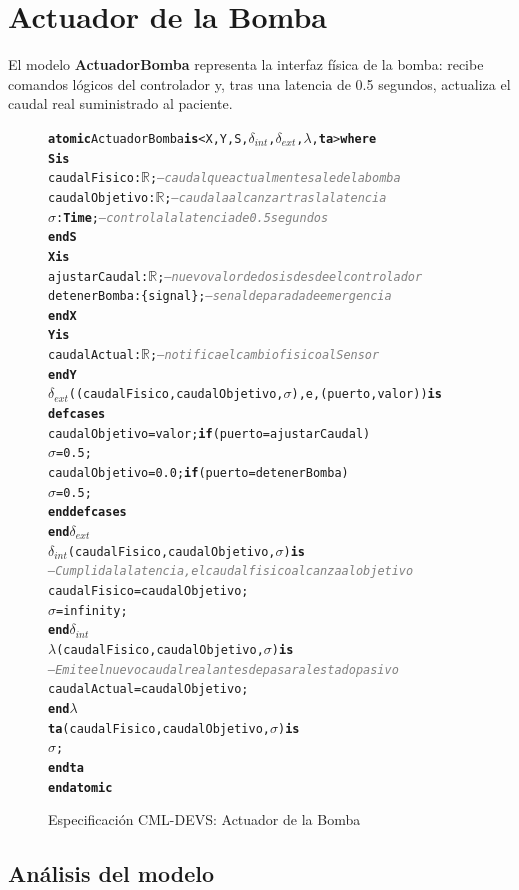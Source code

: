 \documentclass[12pt, a4paper]{article}
\newcommand{\kw}[1]{\textbf{#1}}          %
\newcommand{\cmlR}{$\mathbb{R}$}
\newcommand{\cmlTime}{\textbf{Time}}
\newcommand{\cmlsigma}{$\sigma$}
\newcommand{\dint}{$\delta_{\mathit{int}}$}
\newcommand{\dext}{$\delta_{\mathit{ext}}$}
\newcommand{\clambda}{$\lambda$}
\newcommand{\cmlta}{\textbf{ta}}
\newcommand{\cmlcomment}[1]{\textit{\textcolor{gray}{#1}}}
\newenvironment{cmldevs}{%
  \begin{alltt}\small%
}{%
  \end{alltt}%
}
\begin{document}
\section{Actuador de la Bomba}

El modelo \textbf{ActuadorBomba} representa la interfaz física de la bomba: recibe
comandos lógicos del controlador y, tras una latencia de 0.5 segundos, actualiza
el caudal real suministrado al paciente.

\begin{figure}[H]
\begin{cmldevs}
\kw{atomic} ActuadorBomba \kw{is} <X, Y, S, \dint{}, \dext{}, \clambda{}, \cmlta{}> \kw{where}
\kw{S is}
    caudalFisico   : \cmlR{};       \cmlcomment{-- caudal que actualmente sale de la bomba}
    caudalObjetivo : \cmlR{};       \cmlcomment{-- caudal a alcanzar tras la latencia}
    \cmlsigma{}            : \cmlTime{};    \cmlcomment{-- controla la latencia de 0.5 segundos}
\kw{end S}
\kw{X is}
    ajustarCaudal : \cmlR{};        \cmlcomment{-- nuevo valor de dosis desde el controlador}
    detenerBomba  : \{signal\};     \cmlcomment{-- senal de parada de emergencia}
\kw{end X}
\kw{Y is}
    caudalActual : \cmlR{};         \cmlcomment{-- notifica el cambio fisico al Sensor}
\kw{end Y}
\dext{}((caudalFisico, caudalObjetivo, \cmlsigma{}), e, (puerto, valor)) \kw{is}
    \kw{defcases}
        caudalObjetivo = valor;   \kw{if} (puerto = ajustarCaudal)
        \cmlsigma{} = 0.5;
        caudalObjetivo = 0.0;     \kw{if} (puerto = detenerBomba)
        \cmlsigma{} = 0.5;
    \kw{end defcases}
\kw{end} \dext{}
\dint{}(caudalFisico, caudalObjetivo, \cmlsigma{}) \kw{is}
    \cmlcomment{-- Cumplida la latencia, el caudal fisico alcanza al objetivo}
    caudalFisico = caudalObjetivo;
    \cmlsigma{}          = infinity;
\kw{end} \dint{}
\clambda{}(caudalFisico, caudalObjetivo, \cmlsigma{}) \kw{is}
    \cmlcomment{-- Emite el nuevo caudal real antes de pasar al estado pasivo}
    caudalActual = caudalObjetivo;
\kw{end} \clambda{}
\cmlta{}(caudalFisico, caudalObjetivo, \cmlsigma{}) \kw{is}
    \cmlsigma{};
\kw{end} \cmlta{}
\kw{end atomic}
\end{cmldevs}
\caption{Especificación CML-DEVS: Actuador de la Bomba}
\label{fig:actuador-bomba}
\end{figure}

\subsection*{Análisis del modelo}
\end{document}
